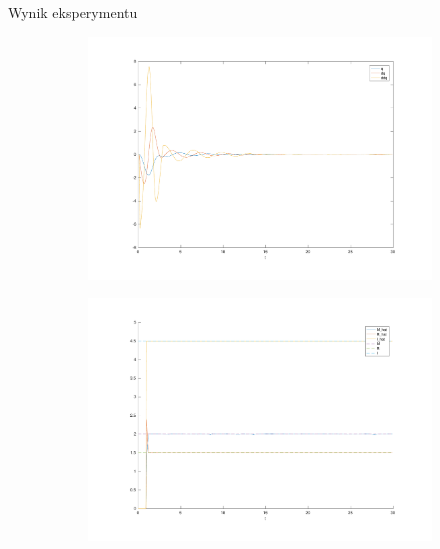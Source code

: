\documentclass{beamer}
\begin{document}
\begin{frame}[allowframebreaks]{Wynik eksperymentu}
\begin{figure}
	\centering
	\begin{subfigure}{.5\textwidth}
		\centering
		\includegraphics[width=\linewidth]{mrozenie_p}
	\end{subfigure}%
	\begin{subfigure}{.5\textwidth}
		\centering
		\includegraphics[width=\linewidth]{mrozenie_c}
		\label{fig:mrozenie_c}
	\end{subfigure}%


\end{figure}
\end{frame}
\end{document}
